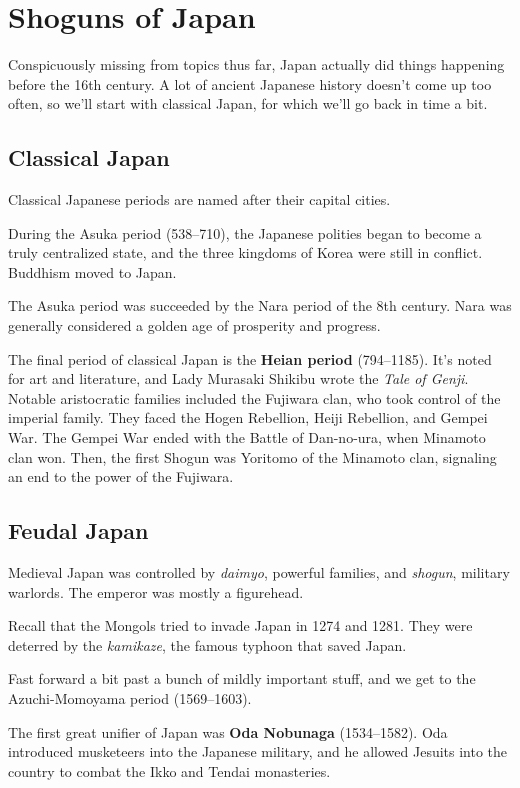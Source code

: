 \section{Shoguns of Japan}

Conspicuously missing from topics thus far, Japan actually did things happening before the 16th century.
A lot of ancient Japanese history doesn't come up too often,
so we'll start with classical Japan, for which we'll go back in time a bit.

\subsection*{Classical Japan}

Classical Japanese periods are named after their capital cities.

During the Asuka period (538--710), the Japanese polities began to become a truly centralized state,
and the three kingdoms of Korea were still in conflict.
Buddhism moved to Japan.

The Asuka period was succeeded by the Nara period of the 8th century.
Nara was generally considered a golden age of prosperity and progress.

The final period of classical Japan is the \textbf{Heian period} (794--1185).
It's noted for art and literature, and Lady Murasaki Shikibu wrote the \textit{Tale of Genji}.
Notable aristocratic families included the Fujiwara clan, who took control of the imperial family.
They faced the Hogen Rebellion, Heiji Rebellion, and Gempei War.
The Gempei War ended with the Battle of Dan-no-ura, when Minamoto clan won.
Then, the first Shogun was Yoritomo of the Minamoto clan, signaling an end to the power of the Fujiwara.

\subsection*{Feudal Japan}

Medieval Japan was controlled by \textit{daimyo}, powerful families, and \textit{shogun}, military warlords.
The emperor was mostly a figurehead.

Recall that the Mongols tried to invade Japan in 1274 and 1281.
They were deterred by the \textit{kamikaze}, the famous typhoon that saved Japan.

Fast forward a bit past a bunch of mildly important stuff,
and we get to the Azuchi-Momoyama period (1569--1603).

The first great unifier of Japan was \textbf{Oda Nobunaga} (1534--1582).
Oda introduced musketeers into the Japanese military,
and he allowed Jesuits into the country to combat the Ikko and Tendai monasteries.

